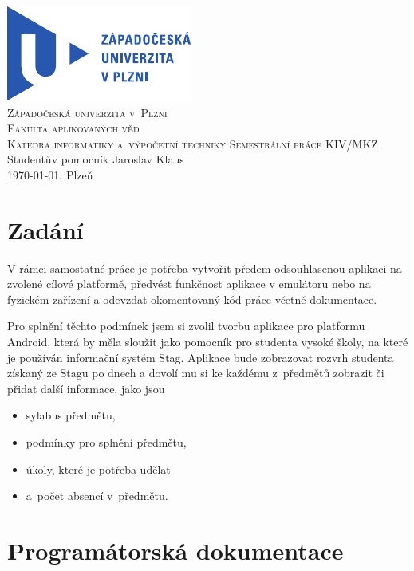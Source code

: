 \documentclass[12pt, a4paper]{article}
\begin{document}
	\begin{titlepage}
		\begin{center}
			\includegraphics{img/ZCULogo.pdf}\\[1cm]
			\textsc{\LARGE Západočeská univerzita v~Plzni}\\[0.1cm]
			\textsc{\Large Fakulta aplikovaných věd}\\[0.1cm]
			\textsc{\large Katedra informatiky a~výpočetní techniky}
			\vfill
			\textsc{\LARGE Semestrální práce KIV/MKZ}\\[0.2cm]
			\LARGE{Studentův pomocník}
			\vfill
			Jaroslav Klaus\\[0.2cm]
			\today, Plzeň
		\end{center}
	\end{titlepage}

	\tableofcontents
	\newpage

	\section{Zadání}
	V rámci samostatné práce je potřeba vytvořit předem odsouhlasenou aplikaci na zvolené cílové platformě, předvést funkčnost aplikace v emulátoru nebo na fyzickém zařízení a odevzdat okomentovaný kód práce včetně dokumentace.
	
	Pro splnění těchto podmínek jsem si zvolil tvorbu aplikace pro platformu Android, která by měla sloužit jako pomocník pro studenta vysoké školy, na které je používán informační systém Stag. Aplikace bude zobrazovat rozvrh studenta získaný ze Stagu po dnech a dovolí mu si ke každému z~předmětů zobrazit či přidat další informace, jako jsou
		\begin{itemize}
			\item sylabus předmětu,
			\item podmínky pro splnění předmětu,
			\item úkoly, které je potřeba udělat
			\item a~počet absencí v~předmětu.
		\end{itemize}
	
	\section{Programátorská dokumentace}
\end{document}
